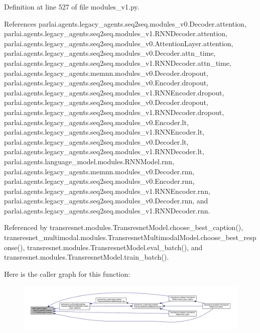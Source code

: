Definition at line 527 of file modules\+\_\+v1.\+py.



References parlai.\+agents.\+legacy\+\_\+agents.\+seq2seq.\+modules\+\_\+v0.\+Decoder.\+attention, parlai.\+agents.\+legacy\+\_\+agents.\+seq2seq.\+modules\+\_\+v1.\+R\+N\+N\+Decoder.\+attention, parlai.\+agents.\+legacy\+\_\+agents.\+seq2seq.\+modules\+\_\+v0.\+Attention\+Layer.\+attention, parlai.\+agents.\+legacy\+\_\+agents.\+seq2seq.\+modules\+\_\+v0.\+Decoder.\+attn\+\_\+time, parlai.\+agents.\+legacy\+\_\+agents.\+seq2seq.\+modules\+\_\+v1.\+R\+N\+N\+Decoder.\+attn\+\_\+time, parlai.\+agents.\+legacy\+\_\+agents.\+memnn.\+modules\+\_\+v0.\+Decoder.\+dropout, parlai.\+agents.\+legacy\+\_\+agents.\+seq2seq.\+modules\+\_\+v0.\+Encoder.\+dropout, parlai.\+agents.\+legacy\+\_\+agents.\+seq2seq.\+modules\+\_\+v1.\+R\+N\+N\+Encoder.\+dropout, parlai.\+agents.\+legacy\+\_\+agents.\+seq2seq.\+modules\+\_\+v0.\+Decoder.\+dropout, parlai.\+agents.\+legacy\+\_\+agents.\+seq2seq.\+modules\+\_\+v1.\+R\+N\+N\+Decoder.\+dropout, parlai.\+agents.\+legacy\+\_\+agents.\+seq2seq.\+modules\+\_\+v0.\+Encoder.\+lt, parlai.\+agents.\+legacy\+\_\+agents.\+seq2seq.\+modules\+\_\+v1.\+R\+N\+N\+Encoder.\+lt, parlai.\+agents.\+legacy\+\_\+agents.\+seq2seq.\+modules\+\_\+v0.\+Decoder.\+lt, parlai.\+agents.\+legacy\+\_\+agents.\+seq2seq.\+modules\+\_\+v1.\+R\+N\+N\+Decoder.\+lt, parlai.\+agents.\+language\+\_\+model.\+modules.\+R\+N\+N\+Model.\+rnn, parlai.\+agents.\+legacy\+\_\+agents.\+memnn.\+modules\+\_\+v0.\+Decoder.\+rnn, parlai.\+agents.\+legacy\+\_\+agents.\+seq2seq.\+modules\+\_\+v0.\+Encoder.\+rnn, parlai.\+agents.\+legacy\+\_\+agents.\+seq2seq.\+modules\+\_\+v1.\+R\+N\+N\+Encoder.\+rnn, parlai.\+agents.\+legacy\+\_\+agents.\+seq2seq.\+modules\+\_\+v0.\+Decoder.\+rnn, and parlai.\+agents.\+legacy\+\_\+agents.\+seq2seq.\+modules\+\_\+v1.\+R\+N\+N\+Decoder.\+rnn.



Referenced by transresnet.\+modules.\+Transresnet\+Model.\+choose\+\_\+best\+\_\+caption(), transresnet\+\_\+multimodal.\+modules.\+Transresnet\+Multimodal\+Model.\+choose\+\_\+best\+\_\+response(), transresnet.\+modules.\+Transresnet\+Model.\+eval\+\_\+batch(), and transresnet.\+modules.\+Transresnet\+Model.\+train\+\_\+batch().

Here is the caller graph for this function\+:
\nopagebreak
\begin{figure}[H]
\begin{center}
\leavevmode
\includegraphics[width=350pt]{classparlai_1_1agents_1_1legacy__agents_1_1seq2seq_1_1modules__v1_1_1RNNDecoder_aa0fdddaf98d3385b432a9b52a0d1adbb_icgraph}
\end{center}
\end{figure}


